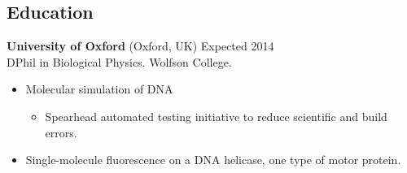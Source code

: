 \documentclass[margin]{res}
\newcommand{\locdatesubsection}[3]{\textbf{#1} (#2) \hfill #3}
\begin{document}
 
\begin{sloppypar}
 
 

\address{2115 Cloville Avenue\\
         Baltimore, MD 21214\\
         \texttt{+}1 443 257 5953}
\address{\texttt{ryan.m.harrison@gmail.com}\\
         \texttt{linkedin.com/in/rmharri}\\
         \texttt{github.com/rmharrison}}
\address{Wolfson College\\ 
         Oxford OX2 6UD\\
         \texttt{+}44 07523 229446}

\begin{resume} 
\setlength{\parskip}{1.00ex}
\setlength{\parindent}{0pt}
 
\section{Education} 
\locdatesubsection{University of Oxford}{Oxford, UK}{Expected 2014}\\
DPhil in Biological Physics. Wolfson College.

\begin{itemize}
\item Molecular simulation of DNA
    \begin{itemize}
    \item Spearhead automated testing initiative to reduce scientific and build errors.
    \end{itemize}
\item Single-molecule fluorescence on a DNA helicase, one type of motor protein.
\end{itemize}


\end{resume}
\end{sloppypar}
\end{document}
